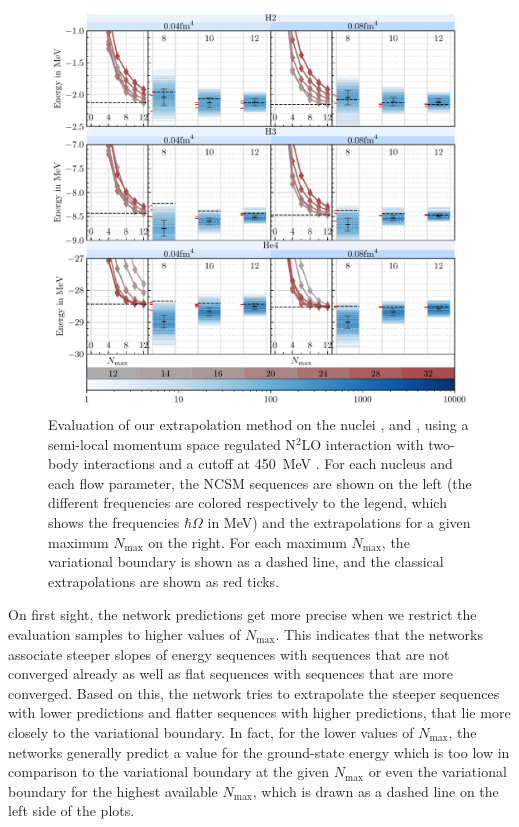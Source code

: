 \begin{figure}[H]
  \centering
  \includegraphics[width=\textwidth]{media/vanilla_evaluation_ohne_fehlfit.pdf}
  \caption{Evaluation of our extrapolation method on the nuclei ,  and , using a semi-local momentum space regulated N$^{2}$LO interaction with two-body interactions and a cutoff at \SI{450}{\mega\electronvolt} \cite{smsquelle}. For each nucleus and each flow parameter, the NCSM sequences are shown on the left (the different frequencies are colored respectively to the legend, which shows the frequencies $\hbar\Omega$ in \si[]{\mega\electronvolt}) and the extrapolations for a given maximum $N_\mathrm{max}$ on the right. For each maximum $N_\mathrm{max}$, the variational boundary is shown as a dashed line, and the classical extrapolations are shown as red ticks.}
  \label{fig:eval_vanilla}
\end{figure}

On first sight, the network predictions get more precise when we restrict the evaluation samples to higher values of $N_\mathrm{max}$. This indicates that the networks associate steeper slopes of energy sequences with sequences that are not converged already as well as flat sequences with sequences that are more converged. Based on this, the network tries to extrapolate the steeper sequences with lower predictions and flatter sequences with higher predictions, that lie more closely to the variational boundary. In fact, for the lower values of $N_\mathrm{max}$, the networks generally predict a value for the ground-state energy which is too low in comparison to the variational boundary at the given $N_\mathrm{max}$ or even the variational boundary for the highest available $N_\mathrm{max}$, which is drawn as a dashed line on the left side of the plots.

